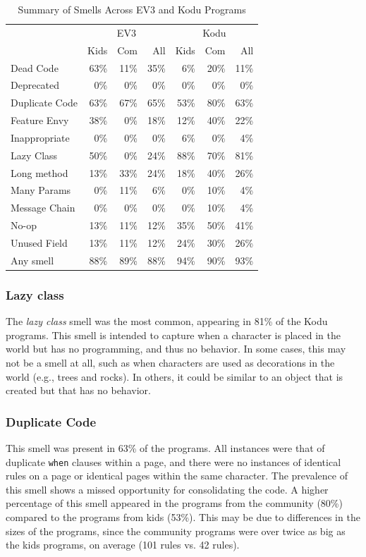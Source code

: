 \documentclass[conference]{IEEEtran}
\begin{document}
\begin{table}
\caption{Summary of Smells Across EV3 and Kodu Programs \label{tab:smellsummary}}
\begin{small}
\begin{center}
\begin{tabular}{| l || r r | r || r r | r||} \cline{2-7}
\multicolumn{1}{c||}{}&\multicolumn{3}{c||}{EV3}&\multicolumn{3}{c||}{Kodu}\\ \cline{2-7}
\multicolumn{1}{c||}{}& Kids & Com & All & Kids & Com & All \\ \hline
Dead Code&63\%&11\%&35\%&6\%&20\%&11\%\\
Deprecated  & 0\% & 0\%& 0\% & 0\%& 0\% & 0\%\\
Duplicate Code&63\%&67\%&65\%&53\%&80\%&63\%\\
Feature Envy&38\%&0\%&18\%&12\%&40\%&22\%\\
Inappropriate &0\%&0\%&0\%&6\%&0\%&4\%\\
Lazy Class&50\%&0\%&24\%&88\%&70\%&81\%\\
Long method&13\%&33\%&24\%&18\%&40\%&26\%\\
Many Params&0\%&11\%&6\%&0\%&10\%&4\%\\
Message Chain&0\%&0\%&0\%&0\%&10\%&4\%\\
No-op&13\%&11\%&12\%&35\%&50\%&41\%\\
Unused Field&13\%&11\%&12\%&24\%&30\%&26\%\\ \hline\hline
Any smell & 88\%&89\%&88\% & 94\%&90\%&93\% \\ \hline
\end{tabular}
\end{center}
\end{small}
\end{table}

\subsubsection{Lazy class}
The \emph{lazy class} smell was the most common, appearing in 81\% of the Kodu programs. This smell is intended to capture when a character is placed in the world but has no programming, and thus no behavior. In some cases, this may not be a smell at all, such as when characters are used as decorations in the world (e.g., trees and rocks). In others, it could be similar to an object that is created but that has no behavior. 

\subsubsection{Duplicate Code}
This smell was present in 63\% of the programs. All instances were that of duplicate {\tt when} clauses within a page, and there were no instances of identical rules on a page or identical pages within the same character. The prevalence of this smell shows a missed opportunity for consolidating the code. A higher percentage of this smell appeared in the programs from the community (80\%) compared to the programs from kids (53\%). This may be due to differences in the sizes of the programs, since the community programs were over twice as big as the kids programs, on average (101 rules vs. 42 rules). 
\end{document}
